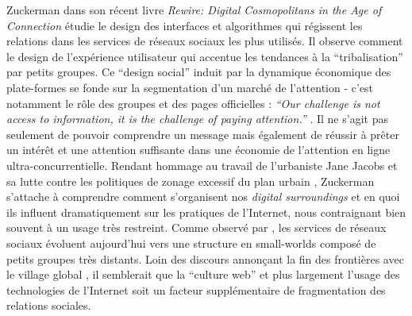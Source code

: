 Zuckerman dans son récent livre \textit{Rewire: Digital Cosmopolitans in the Age of Connection} étudie le design des interfaces et algorithmes qui régissent les relations dans les services de réseaux sociaux les plus utilisés. Il observe comment le design de l’expérience utilisateur qui accentue les tendances à la “tribalisation” par petits groupes. Ce ``design social'' induit par la dynamique économique des plate-formes se fonde sur la segmentation d’un marché de l’attention - c’est notamment le rôle des groupes et des pages officielles : \textit{``Our challenge is not access to information, it is the challenge of paying attention.''} \cite{Zuckerman2013}. Il ne s’agit pas seulement de pouvoir comprendre un message mais également de réussir à prêter un intérêt et une attention suffisante dans une économie de l’attention en ligne ultra-concurrentielle. Rendant hommage au travail de l’urbaniste Jane Jacobs et sa lutte contre les politiques de zonage excessif du plan urbain \cite{Jacobs1961}, Zuckerman s’attache à comprendre comment s’organisent nos \textit{digital surroundings} et en quoi ils influent dramatiquement sur les pratiques de l’Internet, nous contraignant bien souvent à un usage très restreint. Comme observé par \citet{Kumar2006}, les services de réseaux sociaux évoluent aujourd’hui vers une structure en small-worlds composé de petits groupes très distants. Loin des discours annonçant la fin des frontières avec le village global \cite{Breton1997}, il semblerait que la “culture web” et plus largement l’usage des technologies de l’Internet soit un facteur supplémentaire de fragmentation des relations sociales. 

